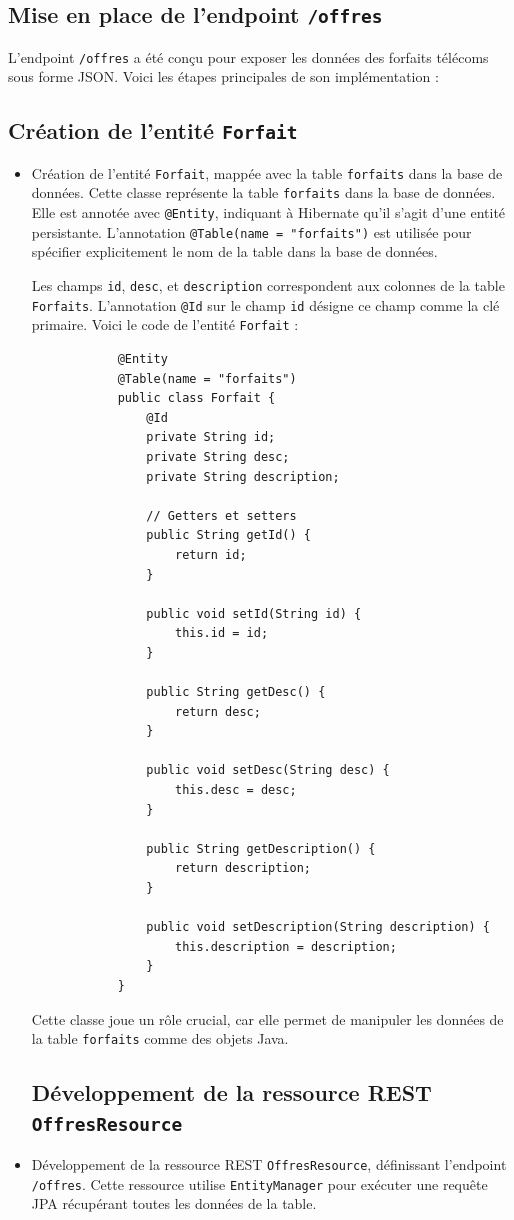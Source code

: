 \documentclass{article}
\begin{document}
	\subsection{Mise en place de l'endpoint \texttt{/offres}}
	
	L'endpoint \texttt{/offres} a été conçu pour exposer les données des forfaits télécoms sous forme JSON. Voici les étapes principales de son implémentation :
	\subsection{Création de l'entité \texttt{Forfait}}
	\begin{itemize}
		\item Création de l'entité \texttt{Forfait}, mappée avec la table \texttt{forfaits} dans la base de données. Cette classe représente la table \texttt{forfaits} dans la base de données. Elle est annotée avec \texttt{@Entity}, indiquant à Hibernate qu'il s'agit d'une entité persistante. L'annotation \texttt{@Table(name = "forfaits")} est utilisée pour spécifier explicitement le nom de la table dans la base de données. 
		
		Les champs \texttt{id}, \texttt{desc}, et \texttt{description} correspondent aux colonnes de la table \texttt{Forfaits}. L'annotation \texttt{@Id} sur le champ \texttt{id} désigne ce champ comme la clé primaire.
		\newpage
		Voici le code de l'entité \texttt{Forfait} :
		\begin{lstlisting}
			@Entity
			@Table(name = "forfaits")
			public class Forfait {
				@Id
				private String id;
				private String desc;
				private String description;
				
				// Getters et setters
				public String getId() {
					return id;
				}
				
				public void setId(String id) {
					this.id = id;
				}
				
				public String getDesc() {
					return desc;
				}
				
				public void setDesc(String desc) {
					this.desc = desc;
				}
				
				public String getDescription() {
					return description;
				}
				
				public void setDescription(String description) {
					this.description = description;
				}
			}
		\end{lstlisting}
		
		Cette classe joue un rôle crucial, car elle permet de manipuler les données de la table \texttt{forfaits} comme des objets Java.
		\subsection{Développement de la ressource REST \texttt{OffresResource}}
		\item Développement de la ressource REST \texttt{OffresResource}, définissant l'endpoint \texttt{/offres}. Cette ressource utilise \texttt{EntityManager} pour exécuter une requête JPA récupérant toutes les données de la table.
	\end{itemize}
	
\end{document}
